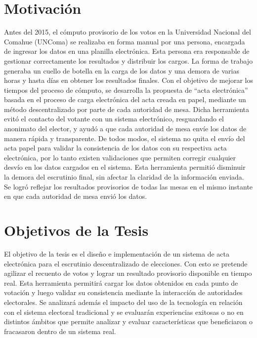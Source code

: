 \section{Motivación}
Antes del 2015, el cómputo provisorio de los votos en la Universidad Nacional del Comahue (UNComa) se realizaba en forma manual por una persona, encargada de ingresar los datos en una planilla electrónica. Esta persona era responsable de gestionar correctamente los resultados y distribuir los cargos. La forma de trabajo generaba un cuello de botella en la carga de los datos y una demora de varias horas y hasta días en obtener los resultados finales. \newline
Con el objetivo de mejorar los tiempos del proceso de cómputo, se desarrolla la propuesta de ``acta electrónica'' basada en el proceso de carga electrónica del acta creada en papel, mediante un método descentralizado  por parte de cada autoridad de mesa. Dicha herramienta evitó el contacto del votante con un sistema electrónico, resguardando el anonimato del elector, y ayudó a que cada autoridad de mesa envíe los datos de manera rápida y transparente. De todos modos, el sistema no quita el envío del acta papel para validar la consistencia de los datos con su respectiva acta electrónica, por lo tanto existen validaciones que permiten corregir cualquier desvío en los datos cargados en el sistema. Esta herramienta permitió disminuir la demora del escrutinio final, sin afectar la claridad de la información enviada. Se logró reflejar los resultados provisorios de todas las mesas 
en el mismo instante en que cada autoridad de mesa envió los datos.

\section{Objetivos de la Tesis}
El objetivo de la tesis es el diseño e implementación de un sistema de acta electrónica para el escrutinio descentralizado de elecciones. Con esto se pretende agilizar el recuento de votos y lograr un resultado provisorio disponible en tiempo real. Esta herramienta permitirá cargar los datos obtenidos en cada punto de votación y luego validar su consistencia mediante la interacción de autoridades electorales. \newline
Se analizará además el impacto del uso de la tecnología en relación con el sistema electoral tradicional y
se evaluarán experiencias exitosas o no en distintos ámbitos que permite analizar y evaluar características que beneficiaron o fracasaron dentro de un sistema real.\newline


